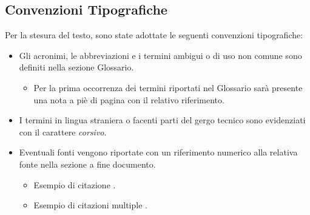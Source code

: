 \subsection{Convenzioni Tipografiche}
Per la stesura del testo, sono state adottate le seguenti convenzioni tipografiche:
\begin{itemize}
    \item Gli acronimi, le abbreviazioni e i termini ambigui o di uso non comune sono definiti nella sezione Glossario.
    \begin{itemize} 
        \item Per la prima occorrenza dei termini riportati nel Glossario sarà presente una nota a piè di pagina con il relativo riferimento.
    \end{itemize}
	\item I termini in lingua straniera o facenti parti del gergo tecnico sono evidenziati con il carattere \emph{corsivo}.
	\item Eventuali fonti vengono riportate con un riferimento numerico alla relativa fonte nella sezione a fine documento.
	\begin{itemize} 
        \item Esempio di citazione \cite{site:agile-manifesto}.
        \item Esempio di citazioni multiple \cite{site:agile-manifesto,article:cellular}.
    \end{itemize}
\end{itemize}
